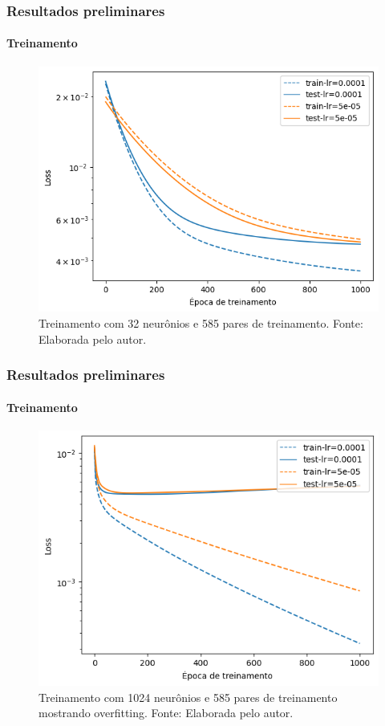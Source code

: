 \documentclass[aspectratio=169]{beamer}
\newcommand{\fautor}{Fonte: Elaborada pelo autor.}
\begin{document}
\begin{frame}
\frametitle{Resultados preliminares}
\framesubtitle{Treinamento}

\begin{figure}[H]
    \centering
    \includegraphics[width=0.5\columnwidth]{loss-ok.png}
    \caption{Treinamento com 32 neurônios e 585 pares de treinamento. \fautor}
\end{figure}

\end{frame}
\begin{frame}
\frametitle{Resultados preliminares}
\framesubtitle{Treinamento}

\begin{figure}[H]
    \centering
    \includegraphics[width=0.5\columnwidth]{loss-overfitting.png}
    \caption{Treinamento com 1024 neurônios e 585 pares de treinamento mostrando overfitting. \fautor}
\end{figure}

\end{frame}
\end{document}
